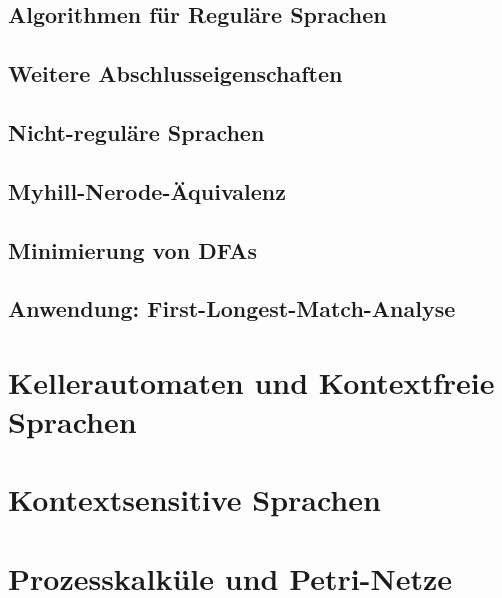 \documentclass[11pt, a4paper]{article}
\theoremstyle{definition}
\theoremstyle{plain}
\numberwithin{equation}{section}
\begin{document}
\subsection{Algorithmen für Reguläre Sprachen}\label{sec:regular_algorithms}
\subsection{Weitere Abschlusseigenschaften}\label{sec:regular_closure2}
\subsection{Nicht-reguläre Sprachen}\label{sec:regular_nonregular}
\subsection{Myhill-Nerode-Äquivalenz}\label{sec:regular_myhill-nerode}
\subsection{Minimierung von DFAs}\label{sec:regular_minimization}
\subsection{Anwendung: First-Longest-Match-Analyse}\label{sec:regular_first-longest-match}




\newpage
\section{Kellerautomaten und Kontextfreie Sprachen}\label{sec:contextfree}

\newpage
\section{Kontextsensitive Sprachen}\label{sec:contextsensitive}

\newpage
\section{Prozesskalküle und Petri-Netze}\label{sec:process}

\newpage
{}


\end{document}
